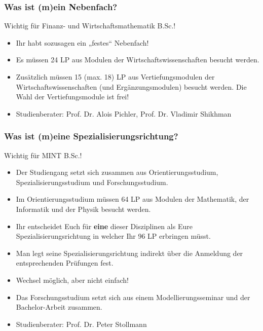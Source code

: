 \documentclass[10pt]{beamer}
\makeatletter
\newcommand{\highl}[1]{\color{tuccolor@ma}#1\color{black}}
\makeatother
\begin{document}
\begin{frame}
	\frametitle{Was ist (m)ein Nebenfach?}

	\highl{Wichtig für Finanz- und Wirtschafts­mathematik B.Sc.!}

	\begin{itemize}
		\item Ihr habt sozusagen ein „festes“ Nebenfach!
		\item Es müssen 24 LP aus Modulen der Wirtschaftswissenschaften besucht werden.
		\item Zusätzlich müssen 15 (max. 18) LP aus Vertiefungsmodulen der Wirtschaftswissenschaften (und Ergänzungsmodulen) besucht werden. Die Wahl der Vertiefungsmodule ist frei!
		\item Studienberater: Prof. Dr. Alois Pichler, Prof. Dr. Vladimir Shikhman
	\end{itemize}
\end{frame}

\begin{frame}
	\frametitle{Was ist (m)eine Spezialisierungsrichtung?}

	\highl{Wichtig für MINT B.Sc.!}

	\begin{itemize}
		\item Der Studiengang setzt sich zusammen aus Orientierungsstudium, Spezialisierungsstudium und Forschungsstudium. 
		\item Im Orientierungsstudium müssen 64 LP aus Modulen der Mathematik, der Informatik und der Physik besucht werden.
		\item Ihr entscheidet Euch für \textbf{eine} dieser Disziplinen als Eure Spezialisierungsrichtung in welcher Ihr 96 LP erbringen müsst.
		\item Man legt seine Spezialisierungsrichtung indirekt über die Anmeldung der entsprechenden Prüfungen fest.
		\item Wechsel möglich, aber nicht einfach!
		\item Das Forschungsstudium setzt sich aus einem Modellierungsseminar und der Bachelor-Arbeit zusammen.
		\item Studienberater: Prof. Dr. Peter Stollmann
	\end{itemize}
\end{frame}
\end{document}
